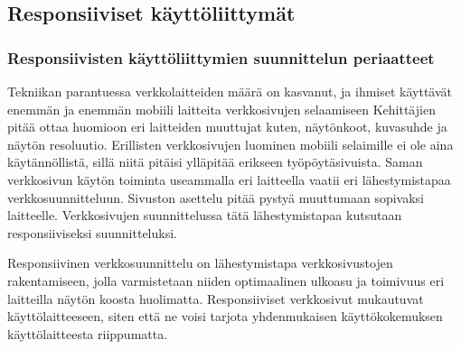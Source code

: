 \documentclass[11pt,a4paper,titlepage,oneside]{article}
\begin{document}
\newpage
{}%






\newpage
{}        %













\newpage
\subsection{Responsiiviset käyttöliittymät}        %




\subsubsection{Responsiivisten käyttöliittymien suunnittelun periaatteet}




Tekniikan parantuessa verkkolaitteiden määrä on kasvanut, ja ihmiset käyttävät enemmän ja enemmän mobiili laitteita verkkosivujen selaamiseen 
Kehittäjien pitää ottaa huomioon eri laitteiden muuttujat kuten, näytönkoot, kuvasuhde ja näytön resoluutio.
Erillisten verkkosivujen luominen mobiili selaimille ei ole aina käytännöllistä, sillä niitä pitäisi ylläpitää erikseen työpöytäsivuista.
Saman verkkosivun käytön toiminta useammalla eri laitteella vaatii eri lähestymistapaa verkkosuunnitteluun. 
Sivuston asettelu pitää pystyä muuttumaan sopivaksi laitteelle.
Verkkosivujen suunnittelussa tätä lähestymistapaa kutsutaan responsiiviseksi suunnitteluksi. 
\medskip



Responsiivinen verkkosuunnittelu on lähestymistapa verkkosivustojen rakentamiseen,
jolla varmistetaan niiden optimaalinen ulkoasu ja toimivuus eri laitteilla näytön koosta huolimatta. 
Responsiiviset verkkosivut mukautuvat käyttölaitteeseen, siten että ne voisi tarjota yhdenmukaisen käyttökokemuksen käyttölaitteesta riippumatta.
\medskip
\end{document}
